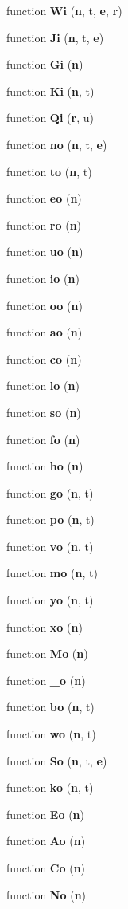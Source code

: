 \begin{DoxyCompactItemize}
function {\bf Wi} ({\bf n}, t, {\bf e}, {\bf r})
\item 
function {\bf Ji} ({\bf n}, t, {\bf e})
\item 
function {\bf Gi} ({\bf n})
\item 
function {\bf Ki} ({\bf n}, t)
\item 
function {\bf Qi} ({\bf r}, u)
\item 
function {\bf no} ({\bf n}, t, {\bf e})
\item 
function {\bf to} ({\bf n}, t)
\item 
function {\bf eo} ({\bf n})
\item 
function {\bf ro} ({\bf n})
\item 
function {\bf uo} ({\bf n})
\item 
function {\bf io} ({\bf n})
\item 
function {\bf oo} ({\bf n})
\item 
function {\bf ao} ({\bf n})
\item 
function {\bf co} ({\bf n})
\item 
function {\bf lo} ({\bf n})
\item 
function {\bf so} ({\bf n})
\item 
function {\bf fo} ({\bf n})
\item 
function {\bf ho} ({\bf n})
\item 
function {\bf go} ({\bf n}, t)
\item 
function {\bf po} ({\bf n}, t)
\item 
function {\bf vo} ({\bf n}, t)
\item 
function {\bf mo} ({\bf n}, t)
\item 
function {\bf yo} ({\bf n}, t)
\item 
function {\bf xo} ({\bf n})
\item 
function {\bf Mo} ({\bf n})
\item 
function {\bf \+\_\+o} ({\bf n})
\item 
function {\bf bo} ({\bf n}, t)
\item 
function {\bf wo} ({\bf n}, t)
\item 
function {\bf So} ({\bf n}, t, {\bf e})
\item 
function {\bf ko} ({\bf n}, t)
\item 
function {\bf Eo} ({\bf n})
\item 
function {\bf Ao} ({\bf n})
\item 
function {\bf Co} ({\bf n})
\item 
function {\bf No} ({\bf n})
\item 

\end{DoxyCompactItemize}
